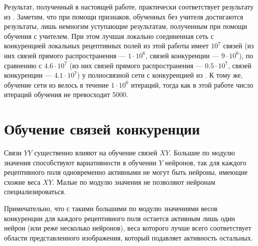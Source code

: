 \documentclass[a4paper]{article}
\begin{document}
Результат, полученный в настоящей работе, практически соответствует результату из \cite{saunders2019locally}. Заметим, что при помощи признаков, обученных без учителя достигаются результаты, лишь немногим уступающие результатам, полученным при помощи обучения с учителем. При этом лучшая локально соединенная сеть с конкуренцией локальных рецептивных полей из этой работы имеет $10^7$ связей (из них связей прямого распространения --- $1 \cdot 10^6$, связей конкуренции --- $9 \cdot 10^6$), по сравнению с $4.6 \cdot 10^7$ (из них связей прямого распространения --- $0.5 \cdot 10^7$, связей конкуренции --- $4.1 \cdot 10^7$) у полносвязной сети с конкуренцией из \cite{mnist2}. К тому же, обучение сети из \cite{mnist2} велось в течение $1 \cdot 10^6$ итераций, тогда как в этой работе число итераций обучения не превосходит 5000.

\section{Обучение связей конкуренции}
Связи $YY$ существенно влияют на обучение связей $XY$. Большие по модулю значения способствуют вариативности в обучении $Y$ нейронов, так для каждого рецептивного поля одновременно активными не могут быть нейроны, имеющие схожие веса $XY$. Малые по модулю значения не позволяют нейронам специализироваться. 

Примечательно, что с такими большими по модулю значениями весов конкуренции для каждого рецептивного поля остается активным лишь один нейрон (или реже несколько нейронов), веса которого лучше всего соответствует области представленного изображения, который подавляет активность остальных.
\end{document}
